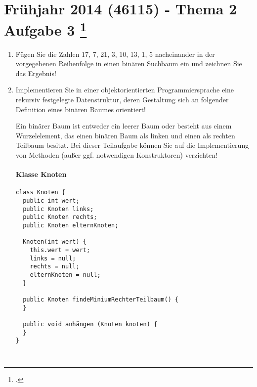 \documentclass{lehramt-informatik-minimal}
\begin{document}
\section{Frühjahr 2014 (46115) - Thema 2 Aufgabe 3
\footcite{examen:46115:2014:09}}

\begin{enumerate}


\item Fügen Sie die Zahlen 17, 7, 21, 3, 10, 13, 1, 5 nacheinander in
der vorgegebenen Reihenfolge in einen binären Suchbaum ein und zeichnen
Sie das Ergebnis!

\begin{center}
\end{center}


\item Implementieren Sie in einer objektorientierten Programmiersprache
eine rekursiv festgelegte Datenstruktur, deren Gestaltung sich an
folgender Definition eines binären Baumes orientiert!

Ein binärer Baum ist entweder ein leerer Baum oder besteht aus einem
Wurzelelement, das einen binären Baum als linken und einen als rechten
Teilbaum besitzt. Bei dieser Teilaufgabe können Sie auf die
Implementierung von Methoden (außer ggf. notwendigen Konstruktoren)
verzichten!

\paragraph{Klasse Knoten}

\begin{verbatim}
class Knoten {
  public int wert;
  public Knoten links;
  public Knoten rechts;
  public Knoten elternKnoten;

  Knoten(int wert) {
    this.wert = wert;
    links = null;
    rechts = null;
    elternKnoten = null;
  }

  public Knoten findeMiniumRechterTeilbaum() {
  }

  public void anhängen (Knoten knoten) {
  }
}
\end{verbatim}

\begin{verbatim}


\end{verbatim}
\end{enumerate}
\end{document}
